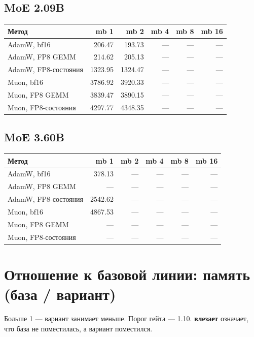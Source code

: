 \documentclass[10pt]{article}
\begin{document}
\subsection{MoE 2.09B}
\begin{center}
\small
\begin{tabular}{lrrrrr}
\toprule
\textbf{Метод} & \textbf{mb 1} & \textbf{mb 2} & \textbf{mb 4} & \textbf{mb 8} & \textbf{mb 16} \\
\midrule
AdamW, bf16 & 206.47 & 193.73 & --- & --- & --- \\
AdamW, FP8 GEMM & 214.62 & 205.13 & --- & --- & --- \\
AdamW, FP8-состояния & 1323.95 & 1324.47 & --- & --- & --- \\
Muon, bf16 & 3786.92 & 3920.33 & --- & --- & --- \\
Muon, FP8 GEMM & 3839.47 & 3890.15 & --- & --- & --- \\
Muon, FP8-состояния & 4297.77 & 4348.35 & --- & --- & --- \\
\bottomrule
\end{tabular}
\end{center}
\subsection{MoE 3.60B}
\begin{center}
\small
\begin{tabular}{lrrrrr}
\toprule
\textbf{Метод} & \textbf{mb 1} & \textbf{mb 2} & \textbf{mb 4} & \textbf{mb 8} & \textbf{mb 16} \\
\midrule
AdamW, bf16 & 378.13 & --- & --- & --- & --- \\
AdamW, FP8 GEMM & --- & --- & --- & --- & --- \\
AdamW, FP8-состояния & 2542.62 & --- & --- & --- & --- \\
Muon, bf16 & 4867.53 & --- & --- & --- & --- \\
Muon, FP8 GEMM & --- & --- & --- & --- & --- \\
Muon, FP8-состояния & --- & --- & --- & --- & --- \\
\bottomrule
\end{tabular}
\end{center}
\section{Отношение к базовой линии: память (база / вариант)}
Больше 1 --- вариант занимает меньше. Порог гейта --- 1.10. \textbf{влезает} означает, что база не поместилась, а вариант поместился.
\end{document}
